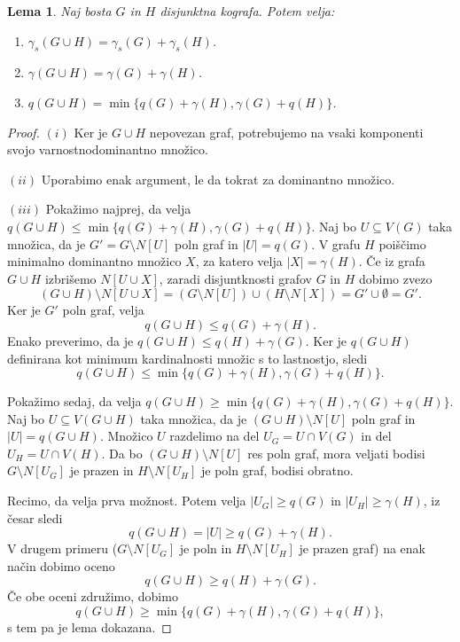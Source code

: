 \documentclass[12pt,a4paper,twoside]{article}
\theoremstyle{definition} %
\theoremstyle{plain} %
\newtheorem{lema}[definicija]{Lema}
\numberwithin{equation}{section}  %
\begin{document}
\begin{lema} \label{lemma4.1}
Naj bosta $G$ in $H$ disjunktna kografa. Potem velja:
\begin{enumerate}[label=(\roman*)]
\item $\gamma_s(G \cup H) = \gamma_s(G) + \gamma_s(H)$.
\item $\gamma(G \cup H) = \gamma(G) + \gamma(H)$.
\item $q(G \cup H) = \min\{q(G) + \gamma(H), \gamma(G) + q(H)\}$.
\end{enumerate}
\end{lema}
\begin{proof}
$(i)$ Ker je $G \cup H$ nepovezan graf, potrebujemo na vsaki komponenti svojo varnostnodominantno množico.

\medskip
$(ii)$ Uporabimo enak argument, le da tokrat za dominantno množico.

\medskip
$(iii)$ Pokažimo najprej, da velja $q(G \cup H) \leq \min\{q(G) + \gamma(H), \gamma(G) + q(H)\}$. Naj bo $U \subseteq V(G)$ taka množica, da je $G' = G \setminus N[U]$ poln graf in $|U| = q(G)$. V grafu $H$ poiščimo minimalno dominantno množico $X$, za katero velja $|X| = \gamma(H)$. Če iz grafa $G \cup H$ izbrišemo $N[U \cup X]$, zaradi disjuntknosti grafov $G$ in $H$ dobimo zvezo
$$(G \cup H) \setminus N[U \cup X] = (G \setminus N[U]) \cup (H \setminus N[X]) = G' \cup \emptyset = G'.$$
Ker je $G'$ poln graf, velja $$q(G \cup H) \leq q(G) + \gamma(H).$$ Enako preverimo, da je $q(G \cup H) \leq q(H) + \gamma(G)$. Ker je $q(G \cup H)$ definirana kot minimum kardinalnosti množic s to lastnostjo, sledi $$q(G \cup H) \leq \min\{q(G) + \gamma(H), \gamma(G) + q(H)\}.$$

Pokažimo sedaj, da velja $q(G \cup H) \geq \min\{q(G) + \gamma(H), \gamma(G) + q(H)\}$. Naj bo $U \subseteq V(G \cup H)$ taka množica, da je $(G \cup H) \setminus N[U]$ poln graf in $|U| = q(G \cup H)$. Množico $U$ razdelimo na del $U_G = U \cap V(G)$ in del $U_H = U \cap V(H)$. Da bo $(G \cup H) \setminus N[U]$ res poln graf, mora veljati bodisi $G \setminus N[U_G]$ je prazen in $H \setminus N[U_H]$ je poln graf, bodisi obratno.

Recimo, da velja prva možnost. Potem velja $|U_G| \geq q(G)$ in $|U_H| \geq \gamma(H)$, iz česar sledi $$q(G \cup H) = |U| \geq q(G) + \gamma(H).$$ V drugem primeru ($G \setminus N[U_G]$ je poln in $H \setminus N[U_H]$ je prazen graf) na enak način dobimo oceno
\begin{equation}
q(G \cup H) \geq q(H) + \gamma(G).
\end{equation}
Če obe oceni združimo, dobimo $$q(G \cup H) \geq \min\{q(G) + \gamma(H), \gamma(G) + q(H)\},$$
s tem pa je lema dokazana. \end{proof}
\end{document}
